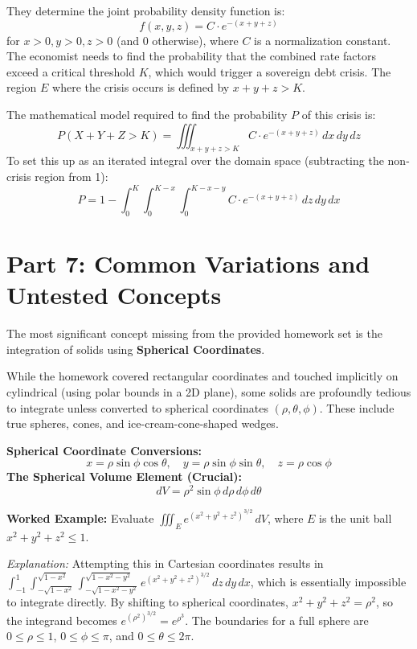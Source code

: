 \documentclass[12pt]{article}
\begin{document}
They determine the joint probability density function is:
\[ f(x,y,z) = C \cdot e^{-(x+y+z)} \]
for $x > 0, y > 0, z > 0$ (and $0$ otherwise), where $C$ is a normalization constant.
The economist needs to find the probability that the combined rate factors exceed a critical threshold $K$, which would trigger a sovereign debt crisis. The region $E$ where the crisis occurs is defined by $x + y + z > K$. 

The mathematical model required to find the probability $P$ of this crisis is:
\[ P(X+Y+Z > K) = \iiint_{x+y+z > K} C \cdot e^{-(x+y+z)} \, dx \, dy \, dz \]
To set this up as an iterated integral over the domain space (subtracting the non-crisis region from 1):
\[ P = 1 - \int_{0}^{K} \int_{0}^{K-x} \int_{0}^{K-x-y} C \cdot e^{-(x+y+z)} \, dz \, dy \, dx \]

\newpage
\section{Part 7: Common Variations and Untested Concepts}

The most significant concept missing from the provided homework set is the integration of solids using \textbf{Spherical Coordinates}. 

While the homework covered rectangular coordinates and touched implicitly on cylindrical (using polar bounds in a 2D plane), some solids are profoundly tedious to integrate unless converted to spherical coordinates $(\rho, \theta, \phi)$. These include true spheres, cones, and ice-cream-cone-shaped wedges.

\textbf{Spherical Coordinate Conversions:}
\[ x = \rho \sin\phi \cos\theta, \quad y = \rho \sin\phi \sin\theta, \quad z = \rho \cos\phi \]
\textbf{The Spherical Volume Element (Crucial):}
\[ dV = \rho^2 \sin\phi \, d\rho \, d\phi \, d\theta \]

\textbf{Worked Example:} Evaluate $\iiint_E e^{(x^2+y^2+z^2)^{3/2}} \, dV$, where $E$ is the unit ball $x^2+y^2+z^2 \le 1$.

\textit{Explanation:} Attempting this in Cartesian coordinates results in $\int_{-1}^{1} \int_{-\sqrt{1-x^2}}^{\sqrt{1-x^2}} \int_{-\sqrt{1-x^2-y^2}}^{\sqrt{1-x^2-y^2}} e^{(x^2+y^2+z^2)^{3/2}} \, dz \, dy \, dx$, which is essentially impossible to integrate directly.
By shifting to spherical coordinates, $x^2+y^2+z^2 = \rho^2$, so the integrand becomes $e^{(\rho^2)^{3/2}} = e^{\rho^3}$. The boundaries for a full sphere are $0 \le \rho \le 1$, $0 \le \phi \le \pi$, and $0 \le \theta \le 2\pi$.
\end{document}
